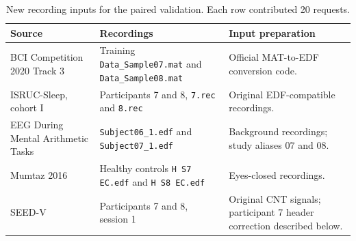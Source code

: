 \begin{table}[!htbp]
\centering\small
\caption{New recording inputs for the paired validation. Each row contributed 20 requests.}
\label{tab:paired-recordings}
\begin{tabular}{>{\raggedright\arraybackslash}p{4.1cm}>{\raggedright\arraybackslash}p{6.1cm}>{\raggedright\arraybackslash}p{4.5cm}}
\toprule
Source & Recordings & Input preparation \\
\midrule
BCI Competition 2020 Track 3 & Training \texttt{Data\_Sample07.mat} and \texttt{Data\_Sample08.mat} & Official MAT-to-EDF conversion code. \\
ISRUC-Sleep, cohort I & Participants 7 and 8, \texttt{7.rec} and \texttt{8.rec} & Original EDF-compatible recordings. \\
EEG During Mental Arithmetic Tasks & \texttt{Subject06\_1.edf} and \texttt{Subject07\_1.edf} & Background recordings; study aliases 07 and 08. \\
Mumtaz 2016 & Healthy controls \texttt{H S7 EC.edf} and \texttt{H S8 EC.edf} & Eyes-closed recordings. \\
SEED-V & Participants 7 and 8, session 1 & Original CNT signals; participant 7 header correction described below. \\
\bottomrule
\end{tabular}
\end{table}
